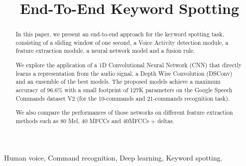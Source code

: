 \documentclass[conference]{IEEEtran}
\begin{document}
\title{End-To-End Keyword Spotting}
\author{
\and
{}
}

\maketitle

\begin{abstract}
In this paper, we present an end-to-end approach for the keyword spotting task, consisting of a sliding window of one second, a Voice Activity detection module, a feature extraction module, a neural network model and a fusion rule.

We explore the application of a 1D Convolutional Neural Network (CNN) that directly learns a representation from the audio signal, a Depth Wise Convolution (DSConv) and an ensemble of the best models.
The proposed models achieve a maximum accuracy of 96.6\% with a small footprint of 127K parameters on the Google Speech Commands dataset V2 (for the 10-commands and 21-commands recognition task).

We also compare the performances of those networks on different feature extraction methods such as 80 Mel, 40 MFCCs and 40MFCCs + deltas.
\end{abstract}

\IEEEpeerreviewmaketitle
\begin{IEEEkeywords}
Human voice, Command recognition, Deep learning, Keyword spotting.
\end{IEEEkeywords}
\end{document}
